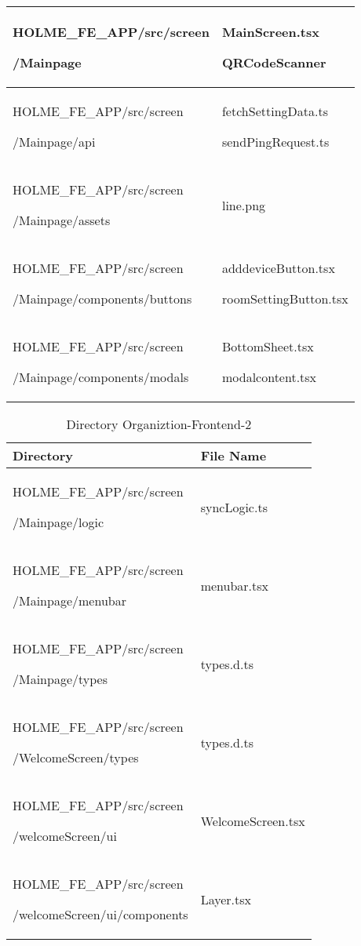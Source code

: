 \documentclass[conference]{IEEEtran}
\begin{document}
\begin{table}[h]
\begin{tabular}{|p{3.9cm}|p{3.9cm}|}
          HOLME\_FE\_APP/src/screen\par/Mainpage & MainScreen.tsx \par QRCodeScanner \\ \hline
          HOLME\_FE\_APP/src/screen\par/Mainpage/api & fetchSettingData.ts \par sendPingRequest.ts \\ \hline
          HOLME\_FE\_APP/src/screen\par/Mainpage/assets & line.png \\ \hline
          HOLME\_FE\_APP/src/screen\par/Mainpage/components/buttons & adddeviceButton.tsx \par roomSettingButton.tsx \\ \hline
          HOLME\_FE\_APP/src/screen\par/Mainpage/components/modals & BottomSheet.tsx \par modalcontent.tsx \\ \hline
	\end{tabular}
\end{table}

\begin{table}[h]
\caption{Directory Organiztion-Frontend-2}
\def\arraystretch{1.24} \small
    \begin{tabular}{|p{3.9cm}|p{3.9cm}|}
        \hline
        Directory & File Name \\ \hline
          HOLME\_FE\_APP/src/screen\par/Mainpage/logic & syncLogic.ts \\ \hline
          HOLME\_FE\_APP/src/screen\par/Mainpage/menubar & menubar.tsx \\ \hline
          HOLME\_FE\_APP/src/screen\par/Mainpage/types & types.d.ts\\ \hline
          HOLME\_FE\_APP/src/screen\par/WelcomeScreen/types & types.d.ts \\ \hline
          HOLME\_FE\_APP/src/screen\par/welcomeScreen/ui &  WelcomeScreen.tsx \\ \hline
          HOLME\_FE\_APP/src/screen\par/welcomeScreen/ui/components &  Layer.tsx \\ \hline
	\end{tabular}
\end{table}
\end{document}
